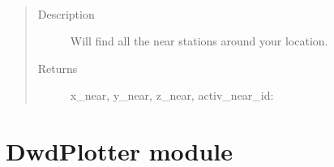 \documentclass[letterpaper,10pt,english]{sphinxmanual}
\begin{document}
\begin{fulllineitems}
\begin{fulllineitems}
\begin{quote}
\begin{description}
\end{description}\end{quote}

\end{fulllineitems}


\begin{fulllineitems}
\label{\detokenize{DwdNearNeighbor:DwdNearNeighbor.NearNeighbor.find_near}}~\begin{quote}\begin{description}
\item[{Description}] \leavevmode
\sphinxAtStartPar
Will find all the near stations around your location.

\item[{Returns}] \leavevmode
\sphinxAtStartPar
x\_near, y\_near, z\_near, activ\_near\_id: 

\end{description}\end{quote}

\end{fulllineitems}


\end{fulllineitems}



\section{DwdPlotter module}
\label{\detokenize{DwdPlotter:module-DwdPlotter}}\label{\detokenize{DwdPlotter:dwdplotter-module}}\label{\detokenize{DwdPlotter::doc}}
\end{document}
